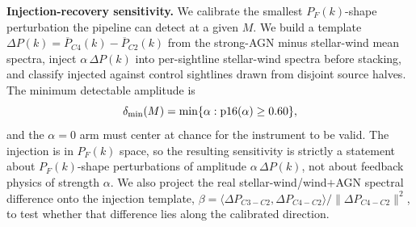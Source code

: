 \textbf{Injection-recovery sensitivity.} We calibrate the smallest $P_F(k)$-shape
perturbation the pipeline can detect at a given $M$. We build a template
$\Delta P(k)=\overline{P}_{C4}(k)-\overline{P}_{C2}(k)$ from the strong-AGN minus
stellar-wind mean spectra, inject $\alpha\,\Delta P(k)$ into per-sightline
stellar-wind spectra before stacking, and classify injected against control
sightlines drawn from disjoint source halves. The minimum detectable amplitude is
\begin{equation}
  \delta_\mathrm{min}(M) = \min\{\alpha : \mathrm{p16}(\alpha) \geq 0.60\},
  \label{eq:deltamin}
\end{equation}
and the $\alpha=0$ arm must center at chance for the instrument to be valid. The
injection is in $P_F(k)$ space, so the resulting sensitivity is strictly a
statement about $P_F(k)$-shape perturbations of amplitude $\alpha\,\Delta P(k)$,
not about feedback physics of strength $\alpha$. We also project the real
stellar-wind/wind${+}$AGN spectral difference onto the injection template,
$\beta=\langle\Delta P_{C3-C2},\Delta P_{C4-C2}\rangle/\lVert\Delta
P_{C4-C2}\rVert^2$, to test whether that difference lies along the
calibrated direction.
